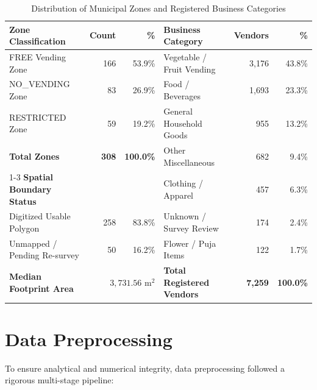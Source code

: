 \begin{table}[htbp]
\caption{Distribution of Municipal Zones and Registered Business Categories}
\label{tab:zone_vendor_distribution}
\centering
\small
\begin{tabular}{lrr|lrr}
\toprule
\textbf{Zone Classification} & \textbf{Count} & \textbf{\%} & \textbf{Business Category} & \textbf{Vendors} & \textbf{\%} \\
\midrule
FREE Vending Zone & 166 & 53.9\% & Vegetable / Fruit Vending & 3,176 & 43.8\% \\
NO\_VENDING Zone & 83 & 26.9\% & Food / Beverages & 1,693 & 23.3\% \\
RESTRICTED Zone & 59 & 19.2\% & General Household Goods & 955 & 13.2\% \\
\midrule
\textbf{Total Zones} & \textbf{308} & \textbf{100.0\%} & Other Miscellaneous & 682 & 9.4\% \\
\cmidrule(r){1-3}
\textbf{Spatial Boundary Status} & & & Clothing / Apparel & 457 & 6.3\% \\
Digitized Usable Polygon & 258 & 83.8\% & Unknown / Survey Review & 174 & 2.4\% \\
Unmapped / Pending Re-survey & 50 & 16.2\% & Flower / Puja Items & 122 & 1.7\% \\
\midrule
\textbf{Median Footprint Area} & \multicolumn{2}{r|}{$3,731.56\text{ m}^2$} & \textbf{Total Registered Vendors} & \textbf{7,259} & \textbf{100.0\%} \\
\bottomrule
\end{tabular}
\end{table}

\section{Data Preprocessing}
\label{sec:data_preprocessing}

To ensure analytical and numerical integrity, data preprocessing followed a rigorous multi-stage pipeline:

